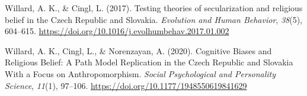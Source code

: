 \documentclass[
  letterpaper,
]{scrbook}
\newlength{\cslhangindent}
\newenvironment{CSLReferences}[2] %
 {\begin{list}{}{%
  \setlength{\itemindent}{0pt}
  \setlength{\leftmargin}{0pt}
  \setlength{\parsep}{0pt}
  \ifodd #1
   \setlength{\leftmargin}{\cslhangindent}
   \setlength{\itemindent}{-1\cslhangindent}
  \fi
  \setlength{\itemsep}{#2\baselineskip}}}
 {\end{list}}
\begin{document}
\begin{CSLReferences}{1}{0}
Willard, A. K., \& Cingl, L. (2017). Testing theories of secularization
and religious belief in the {Czech Republic} and {Slovakia}.
\emph{Evolution and Human Behavior}, \emph{38}(5), 604--615.
\url{https://doi.org/10.1016/j.evolhumbehav.2017.01.002}

Willard, A. K., Cingl, L., \& Norenzayan, A. (2020). Cognitive {Biases}
and {Religious Belief}: {A Path Model Replication} in the {Czech
Republic} and {Slovakia With} a {Focus} on {Anthropomorphism}.
\emph{Social Psychological and Personality Science}, \emph{11}(1),
97--106. \url{https://doi.org/10.1177/1948550619841629}

\end{CSLReferences}


\backmatter
\end{document}
